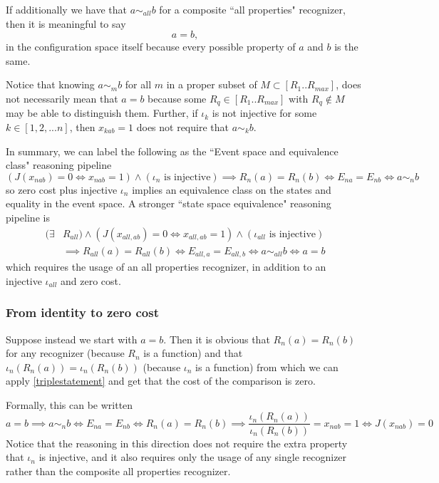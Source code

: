 \documentclass[11pt,a4paper]{article}
\begin{document}
If additionally we have that $a\sim_{all} b$ for a composite ``all properties" recognizer, then it is meaningful to say 
\begin{equation}
    a=b,
\end{equation}
in the configuration space itself because every possible property of $a$ and $b$ is the same.

Notice that knowing $a\sim_m b$ for all $m$ in a proper subset of $M\subset[R_1..R_{max}]$, does not necessarily mean that $a=b$ because some $R_q\in[R_1..R_{max}]$ with $R_q\notin M$ may be able to distinguish them. Further, if $\iota_k$ is not injective for some $k\in[1,2,...n]$, then $x_{kab}=1$ does not require that $a\sim_k b$. 

In summary, we can label the following as the ``Event space and equivalence class" reasoning pipeline
\begin{equation}
    (J(x_{nab})=0\Leftrightarrow x_{nab}=1)\land (\iota_n \text{ is injective})\implies R_n(a)=R_n(b)\Leftrightarrow E_{na}=E_{nb}\Leftrightarrow a\sim_n b \label{eventequivalence}
\end{equation}
so zero cost plus injective $\iota_n$ implies an equivalence class on the states and equality in the event space. A stronger ``state space equivalence" reasoning pipeline is
\begin{align}
    (\exists &R_{all})\land(J(x_{all,ab})=0\Leftrightarrow x_{all,ab}=1)\land(\iota_{all} \text{ is injective})\nonumber\\&\implies R_{all}(a)=R_{all}(b)\Leftrightarrow E_{all,a}=E_{all,b}\Leftrightarrow a\sim_{all} b\Leftrightarrow a=b \label{stateequivaence}
\end{align}
which requires the usage of an all properties recognizer, in addition to an injective $\iota_{all}$ and zero cost.
\subsubsection{From identity to zero cost}
Suppose instead we start with $a=b$. Then it is obvious that $R_n(a)=R_n(b)$ for any recognizer (because $R_n$ is a function) and that $\iota_n(R_n(a))=\iota_n(R_n(b))$ (because $\iota_n$ is a function) from which we can apply \ref{triplestatement} and get that the cost of the comparison is zero. 

Formally,  this can be written
\begin{equation}
    a=b\implies a\sim_nb\Leftrightarrow E_{na}=E_{nb}\Leftrightarrow R_n(a)=R_n(b)\implies \frac{\iota_n(R_n(a))}{\iota_n(R_n(b))}=x_{nab}=1\Leftrightarrow J(x_{nab})=0
\end{equation}
Notice that the reasoning in this direction does not require the extra property that $\iota_n$ is injective, and it also requires only the usage of any single recognizer rather than the composite all properties recognizer. 
\end{document}
